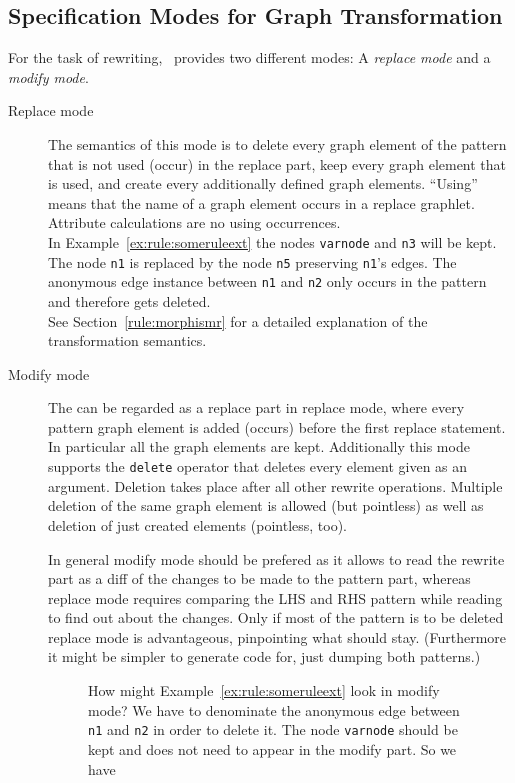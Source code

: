 \subsection{Specification Modes for Graph Transformation}
For the task of rewriting, \GrG\ provides two different modes: A \emph{replace mode} and a \emph{modify mode}.
\begin{description}
  \item[Replace mode] The semantics of this mode is to delete every graph element of the pattern that is not used (occur) in the replace part, keep every graph element that is used, and create every additionally defined graph elements. ``Using'' means that the name of a graph element occurs in a replace graphlet. Attribute calculations are no using occurrences.\\
  In Example~\ref{ex:rule:someruleext} the nodes \texttt{varnode} and \texttt{n3} will be kept. The node \texttt{n1} is replaced by the node \texttt{n5} preserving \texttt{n1}'s edges. The anonymous edge instance between \texttt{n1} and \texttt{n2} only occurs in the pattern and therefore gets deleted.\\
See Section~\ref{rule:morphismr} for a detailed explanation of the transformation semantics.
  \item[Modify mode] The  can be regarded as a replace part in replace mode, where every pattern graph element is added (occurs) before the first replace statement.
In particular all the  graph elements are kept.
Additionally this mode supports the \texttt{delete} operator that deletes every element given as an argument.
Deletion takes place after all other rewrite operations. Multiple deletion of the same graph element is allowed (but pointless) as well as deletion of just created elements (pointless, too).

\begin{note}
In general modify mode should be prefered as it allows to read the rewrite part as a diff of the changes to be made to the pattern part, whereas replace mode requires comparing the LHS and RHS pattern while reading to find out about the changes.
Only if most of the pattern is to be deleted replace mode is advantageous, pinpointing what should stay.
(Furthermore it might be simpler to generate code for, just dumping both patterns.)
\end{note}

\begin{figure}[htbp]
\begin{example}
How might Example~\ref{ex:rule:someruleext} look in modify mode?
We have to denominate the anonymous edge between \texttt{n1} and \texttt{n2} in order to delete it.
The node \texttt{varnode} should be kept and does not need to appear in the modify part.
So we have
\begin{grgen}
rule SomeRuleExtModify(varnode: Node): (Node, EdgeTypeB)  {
  ...
  n1 -e0:Edge-> n2;
  ...
  modify {
    n5:NodeTypeC<n1>;
    n3 -e1:EdgeTypeB-> n5;
    delete(e0);
    eval {
      ...
\end{grgen}
\end{example}
\end{figure}
\end{description}

